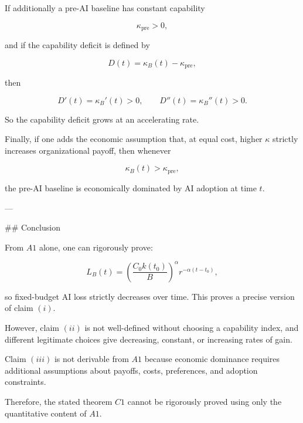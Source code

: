 If additionally a pre-AI baseline has constant capability

\[
\kappa_{\mathrm{pre}}>0,
\]

and if the capability deficit is defined by

\[
D(t)=\kappa_B(t)-\kappa_{\mathrm{pre}},
\]

then

\[
D'(t)=\kappa_B'(t)>0,
\qquad
D''(t)=\kappa_B''(t)>0.
\]

So the capability deficit grows at an accelerating rate.

Finally, if one adds the economic assumption that, at equal cost, higher $\kappa$ strictly increases organizational payoff, then whenever

\[
\kappa_B(t)>\kappa_{\mathrm{pre}},
\]

the pre-AI baseline is economically dominated by AI adoption at time $t$.

---

## Conclusion

From $A1$ alone, one can rigorously prove:

\[
L_B(t)=
\left(\frac{C_0k(t_0)}{B}\right)^\alpha r^{-\alpha(t-t_0)},
\]

so fixed-budget AI loss strictly decreases over time. This proves a precise version of claim $(i)$.

However, claim $(ii)$ is not well-defined without choosing a capability index, and different legitimate choices give decreasing, constant, or increasing rates of gain.

Claim $(iii)$ is not derivable from $A1$ because economic dominance requires additional assumptions about payoffs, costs, preferences, and adoption constraints.

Therefore, the stated theorem $C1$ cannot be rigorously proved using only the quantitative content of $A1$.